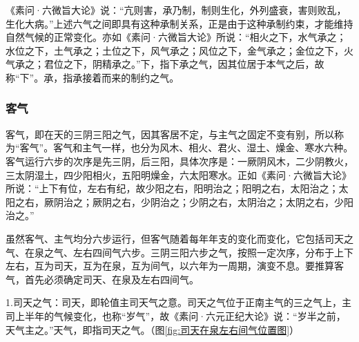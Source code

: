 \documentclass[12pt]{ctexbook}
\begin{document}
《素问·六微旨大论》说：“亢则害，承乃制，制则生化，外列盛衰，害则败乱，生化大病。”上述六气之间即具有这种承制关系，正是由于这种承制约束，才能维持自然气候的正常变化。亦如《素问·六微旨大论》所说：“相火之下，水气承之；水位之下，土气承之；土位之下，风气承之；风位之下，金气承之；金位之下，火气承之；君位之下，阴精承之。”下，指下承之气，因其位居于本气之后，故称“下”。承，指承接着而来的制约之气。

\subsubsection{客气}%

客气，即在天的三阴三阳之气，因其客居不定，与主气之固定不变有别，所以称为“客气”。客气和主气一样，也分为风木、相火、君火、湿土、燥金、寒水六种。客气运行六步的次序是先三阴，后三阳，具体次序是：一厥阴风木，二少阴教火，三太阴湿土，四少阳相火，五阳明燥金，六太阳寒水。正如《素问·六微旨大论》所说：“上下有位，左右有纪，故少阳之右，阳明治之；阳明之右，太阳治之；太阳之右，厥阴治之；厥阴之右，少阴治之；少阴之右，太阴治之；太阴之右，少阳治之。”

虽然客气、主气均分六步运行，但客气随着每年年支的变化而变化，它包括司天之气、在泉之气、左右四间气六步。三阴三阳六步之气，按照一定次序，分布于上下左右，互为司天，互为在泉，互为间气，以六年为一周期，演变不息。要推算客气，首先必须确定司天、在泉及左右四间气。

1.司天之气：司天，即轮值主司天气之意。司天之气位于正南主气的三之气上，主司上半年的气候变化，也称“岁气”，故《素问·六元正纪大论》说：“岁半之前，天气主之。”天气，即指司天之气。（图\ref{fig:司天在泉左右间气位置图}）

\end{document}
